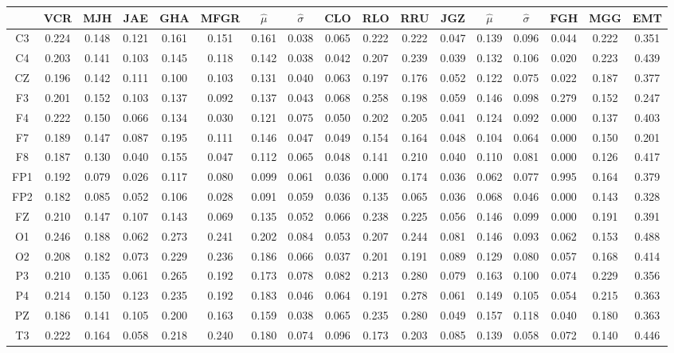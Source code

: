\documentclass[12pt,a4paper]{mitthesis}
\begin{document}
\begin{SidewaysFigure}
\centering
\begin{tabular}{c||ccccc|cc||cccc|cc||ccc}
& VCR & MJH & JAE & GHA & MFGR &$\widehat{\mu}$ & $\widehat{\sigma}$
& CLO & RLO & RRU & JGZ &$\widehat{\mu}$ & $\widehat{\sigma}$
& FGH & MGG & EMT \\
\hline
C3&0.224&0.148&0.121&0.161&0.151&0.161&0.038&0.065&0.222&0.222&0.047&0.139&0.096&0.044&0.222&0.351 \\
C4&0.203&0.141&0.103&0.145&0.118&0.142&0.038&0.042&0.207&0.239&0.039&0.132&0.106&0.020&0.223&0.439 \\
CZ&0.196&0.142&0.111&0.100&0.103&0.131&0.040&0.063&0.197&0.176&0.052&0.122&0.075&0.022&0.187&0.377 \\
F3&0.201&0.152&0.103&0.137&0.092&0.137&0.043&0.068&0.258&0.198&0.059&0.146&0.098&0.279&0.152&0.247 \\
F4&0.222&0.150&0.066&0.134&0.030&0.121&0.075&0.050&0.202&0.205&0.041&0.124&0.092&0.000&0.137&0.403 \\
F7&0.189&0.147&0.087&0.195&0.111&0.146&0.047&0.049&0.154&0.164&0.048&0.104&0.064&0.000&0.150&0.201 \\
F8&0.187&0.130&0.040&0.155&0.047&0.112&0.065&0.048&0.141&0.210&0.040&0.110&0.081&0.000&0.126&0.417 \\
FP1&0.192&0.079&0.026&0.117&0.080&0.099&0.061&0.036&0.000&0.174&0.036&0.062&0.077&0.995&0.164&0.379 \\
FP2&0.182&0.085&0.052&0.106&0.028&0.091&0.059&0.036&0.135&0.065&0.036&0.068&0.046&0.000&0.143&0.328 \\
FZ&0.210&0.147&0.107&0.143&0.069&0.135&0.052&0.066&0.238&0.225&0.056&0.146&0.099&0.000&0.191&0.391 \\
O1&0.246&0.188&0.062&0.273&0.241&0.202&0.084&0.053&0.207&0.244&0.081&0.146&0.093&0.062&0.153&0.488 \\
O2&0.208&0.182&0.073&0.229&0.236&0.186&0.066&0.037&0.201&0.191&0.089&0.129&0.080&0.057&0.168&0.414 \\
P3&0.210&0.135&0.061&0.265&0.192&0.173&0.078&0.082&0.213&0.280&0.079&0.163&0.100&0.074&0.229&0.356 \\
P4&0.214&0.150&0.123&0.235&0.192&0.183&0.046&0.064&0.191&0.278&0.061&0.149&0.105&0.054&0.215&0.363 \\
PZ&0.186&0.141&0.105&0.200&0.163&0.159&0.038&0.065&0.235&0.280&0.049&0.157&0.118&0.040&0.180&0.363 \\
T3&0.222&0.164&0.058&0.218&0.240&0.180&0.074&0.096&0.173&0.203&0.085&0.139&0.058&0.072&0.140&0.446 \\

\end{tabular}
\end{SidewaysFigure}
\end{document}
